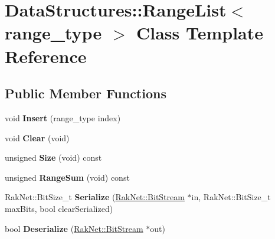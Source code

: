 \hypertarget{class_data_structures_1_1_range_list}{\section{Data\-Structures\-:\-:Range\-List$<$ range\-\_\-type $>$ Class Template Reference}
\label{class_data_structures_1_1_range_list}
}
\subsection*{Public Member Functions}
\begin{DoxyCompactItemize}
\item 
\hypertarget{class_data_structures_1_1_range_list_a53378f34c54e2393a59aba8cdf6ba792}{void {\bfseries Insert} (range\-\_\-type index)}\label{class_data_structures_1_1_range_list_a53378f34c54e2393a59aba8cdf6ba792}

\item 
\hypertarget{class_data_structures_1_1_range_list_a7bac8a0538ffe6d10e61eaf94bd3e19a}{void {\bfseries Clear} (void)}\label{class_data_structures_1_1_range_list_a7bac8a0538ffe6d10e61eaf94bd3e19a}

\item 
\hypertarget{class_data_structures_1_1_range_list_a5dae90c5e4f3f575e78c01fc708a85c0}{unsigned {\bfseries Size} (void) const }\label{class_data_structures_1_1_range_list_a5dae90c5e4f3f575e78c01fc708a85c0}

\item 
\hypertarget{class_data_structures_1_1_range_list_a9ca3ee08062ee2a993c37a0910a3e343}{unsigned {\bfseries Range\-Sum} (void) const }\label{class_data_structures_1_1_range_list_a9ca3ee08062ee2a993c37a0910a3e343}

\item 
\hypertarget{class_data_structures_1_1_range_list_a340d5f83f47db070f250ced701b1d112}{Rak\-Net\-::\-Bit\-Size\-\_\-t {\bfseries Serialize} (\hyperlink{class_rak_net_1_1_bit_stream}{Rak\-Net\-::\-Bit\-Stream} $\ast$in, Rak\-Net\-::\-Bit\-Size\-\_\-t max\-Bits, bool clear\-Serialized)}\label{class_data_structures_1_1_range_list_a340d5f83f47db070f250ced701b1d112}

\item 
\hypertarget{class_data_structures_1_1_range_list_a9b1a0187e0f014a564704064c8dce2a4}{bool {\bfseries Deserialize} (\hyperlink{class_rak_net_1_1_bit_stream}{Rak\-Net\-::\-Bit\-Stream} $\ast$out)}\label{class_data_structures_1_1_range_list_a9b1a0187e0f014a564704064c8dce2a4}

\end{DoxyCompactItemize}

